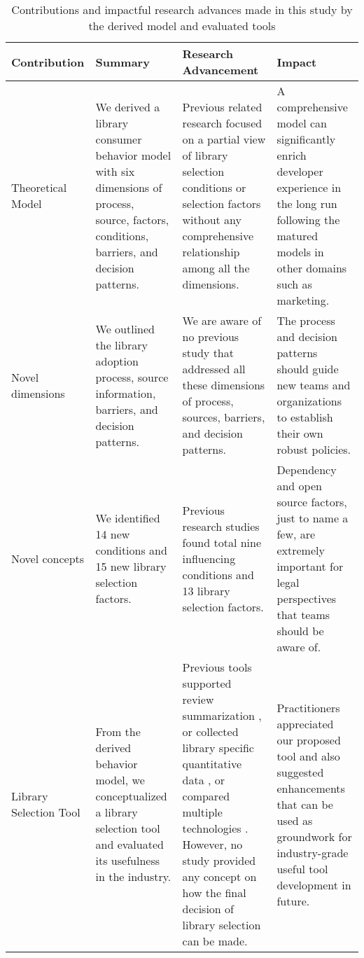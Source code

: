 \begin{table}[]
    \centering
    \caption{Contributions and impactful research advances made in this study by the derived model and evaluated tools}
   
    \begin{tabular}{>{\raggedright}p{1.6cm}p{3.2cm}p{4.7cm}p{4cm}}%
        \toprule
        \textbf{Contribution} & \textbf{Summary} & \textbf{Research Advancement} & \textbf{Impact} \\
        \midrule
            Theoretical Model & We derived a library consumer behavior model with six dimensions of process, source, factors, conditions, barriers, and decision patterns. & Previous related research \cite{spinellis2019select, larios2020selecting, wasserman2017osspal,
    li2022exploring} focused on a partial view of library selection conditions or selection factors without any comprehensive relationship among all the dimensions.  & A comprehensive model can significantly enrich developer experience in the long run following the matured models in other domains such as marketing. \\ 
            Novel dimensions & We outlined the library adoption process, source information, barriers, and decision patterns. & We are aware of no previous study that addressed all these dimensions of process, sources, barriers, and decision patterns.  & 
            The process and decision patterns should guide new teams and organizations to establish their own robust policies.  \\ 
            Novel concepts & We identified 14 new conditions and 15 new library selection factors. & Previous research studies \cite{spinellis2019select, larios2020selecting, de2018library, de2018empirical, el2020libcomp, liu2021api, uddin2019understanding} found total nine influencing conditions and 13 library selection factors.  & Dependency and open source factors, just to name a few, are extremely important for legal perspectives that teams should be aware of. \\ \hline
            Library Selection Tool & From the derived behavior model, we conceptualized a library selection tool and evaluated its usefulness in the industry. & Previous tools supported review summarization \cite{lin2019pattern, uddin2019automatic, uddin2022empirical}, or collected library specific quantitative data \cite{de2018library, de2018empirical, el2020libcomp}, or compared multiple technologies \cite{huang2018tell, wang2020difftech, wang2021difftech, yan2022concept}. However, no study provided any concept on how the final decision of library selection can be made. & Practitioners appreciated our proposed tool and also suggested enhancements that can be used as groundwork for industry-grade useful tool development in future. \\ 
            

\end{tabular}
\end{table}

